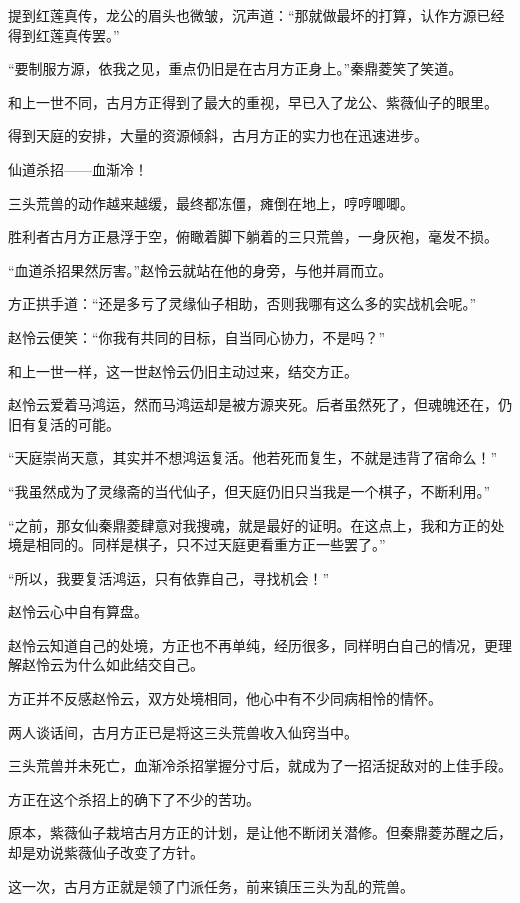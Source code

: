 \begin{this_body}
提到红莲真传，龙公的眉头也微皱，沉声道：“那就做最坏的打算，认作方源已经得到红莲真传罢。”

“要制服方源，依我之见，重点仍旧是在古月方正身上。”秦鼎菱笑了笑道。

和上一世不同，古月方正得到了最大的重视，早已入了龙公、紫薇仙子的眼里。

得到天庭的安排，大量的资源倾斜，古月方正的实力也在迅速进步。

仙道杀招——血渐冷！

三头荒兽的动作越来越缓，最终都冻僵，瘫倒在地上，哼哼唧唧。

胜利者古月方正悬浮于空，俯瞰着脚下躺着的三只荒兽，一身灰袍，毫发不损。

“血道杀招果然厉害。”赵怜云就站在他的身旁，与他并肩而立。

方正拱手道：“还是多亏了灵缘仙子相助，否则我哪有这么多的实战机会呢。”

赵怜云便笑：“你我有共同的目标，自当同心协力，不是吗？”

和上一世一样，这一世赵怜云仍旧主动过来，结交方正。

赵怜云爱着马鸿运，然而马鸿运却是被方源夹死。后者虽然死了，但魂魄还在，仍旧有复活的可能。

“天庭崇尚天意，其实并不想鸿运复活。他若死而复生，不就是违背了宿命么！”

“我虽然成为了灵缘斋的当代仙子，但天庭仍旧只当我是一个棋子，不断利用。”

“之前，那女仙秦鼎菱肆意对我搜魂，就是最好的证明。在这点上，我和方正的处境是相同的。同样是棋子，只不过天庭更看重方正一些罢了。”

“所以，我要复活鸿运，只有依靠自己，寻找机会！”

赵怜云心中自有算盘。

赵怜云知道自己的处境，方正也不再单纯，经历很多，同样明白自己的情况，更理解赵怜云为什么如此结交自己。

方正并不反感赵怜云，双方处境相同，他心中有不少同病相怜的情怀。

两人谈话间，古月方正已是将这三头荒兽收入仙窍当中。

三头荒兽并未死亡，血渐冷杀招掌握分寸后，就成为了一招活捉敌对的上佳手段。

方正在这个杀招上的确下了不少的苦功。

原本，紫薇仙子栽培古月方正的计划，是让他不断闭关潜修。但秦鼎菱苏醒之后，却是劝说紫薇仙子改变了方针。

这一次，古月方正就是领了门派任务，前来镇压三头为乱的荒兽。


\end{this_body}
